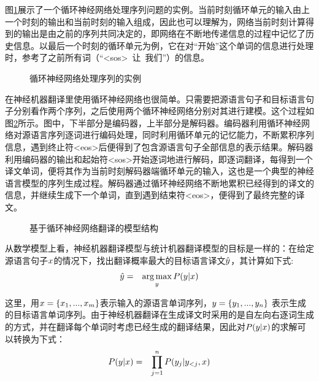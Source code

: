 \parinterval 图\ref{fig:10-8}展示了一个循环神经网络处理序列问题的实例。当前时刻循环单元的输入由上一个时刻的输出和当前时刻的输入组成，因此也可以理解为，网络当前时刻计算得到的输出是由之前的序列共同决定的，即网络在不断地传递信息的过程中记忆了历史信息。以最后一个时刻的循环单元为例，它在对“开始”这个单词的信息进行处理时，参考了之前所有词（“<sos>\ 让\ 我们”）的信息。

\begin{figure}[htp]
\centering

\caption{循环神经网络处理序列的实例}
\label{fig:10-8}
\end{figure}

\parinterval 在神经机器翻译里使用循环神经网络也很简单。只需要把源语言句子和目标语言句子分别看作两个序列，之后使用两个循环神经网络分别对其进行建模。这个过程如图\ref{fig:10-9}所示。图中，下半部分是编码器，上半部分是解码器。编码器利用循环神经网络对源语言序列逐词进行编码处理，同时利用循环单元的记忆能力，不断累积序列信息，遇到终止符<eos>后便得到了包含源语言句子全部信息的表示结果。解码器利用编码器的输出和起始符<sos>开始逐词地进行解码，即逐词翻译，每得到一个译文单词，便将其作为当前时刻解码器端循环单元的输入，这也是一个典型的神经语言模型的序列生成过程。解码器通过循环神经网络不断地累积已经得到的译文的信息，并继续生成下一个单词，直到遇到结束符<eos>，便得到了最终完整的译文。

\begin{figure}[htp]
\centering

\caption{基于循环神经网络翻译的模型结构}
\label{fig:10-9}
\end{figure}

\parinterval 从数学模型上看，神经机器翻译模型与统计机器翻译模型的目标是一样的：在给定源语言句子${x}$的情况下，找出翻译概率最大的目标语言译文$\hat{{y}}$，其计算如下式:
\vspace{-1em}
\begin{eqnarray}
\hat{{{y}}} &=& \operatorname*{arg\,max}_{{{y}}} {P} ({{y}} | {{x}})
\label{eq:10-1}
\end{eqnarray}

\noindent 这里，用${{x}}=\{ x_1,..., x_m \}$表示输入的源语言单词序列，${{y}}=\{ y_1,..., y_n \}$ 表示生成的目标语言单词序列。由于神经机器翻译在生成译文时采用的是自左向右逐词生成的方式，并在翻译每个单词时考虑已经生成的翻译结果，因此对$ {P} ({{y}} | {{x}})$的求解可以转换为下式：
\begin{eqnarray}
{P} ({{y}} | {{x}}) &=& \prod_{j=1}^{n} {P} ( y_j | {{y}}_{<j }, {{x}}  )
\label{eq:10-2}
\end{eqnarray}


